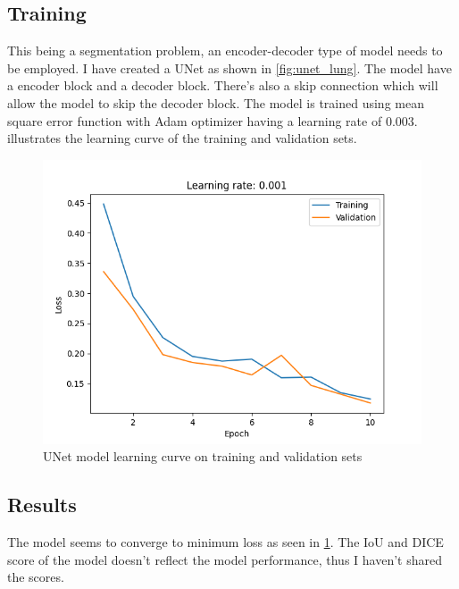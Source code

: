 \subsection{Training}

    This being a segmentation problem, an encoder-decoder type of model needs to be employed. I have created a UNet as shown in \cref{fig:unet_lung}. The model have a encoder block and a decoder block. There's also a skip connection which will allow the model to skip the decoder block. The model is trained using mean square error function with Adam optimizer having a learning rate of $0.003$.  illustrates the learning curve of the training and validation sets.

    \begin{figure}[htbp]
        \centering
        \includegraphics[width=\linewidth]{../outputs/segmentation/Segmentation01A/loss-curve.png}
        \caption{UNet model learning curve on training and validation sets}
        \label{fig:unet-learning-curve}
    \end{figure}

\subsection{Results}

    The model seems to converge to minimum loss as seen in \cref{fig:unet-learning-curve}. The IoU and DICE score of the model doesn't reflect the model performance, thus I haven't shared the scores. 
